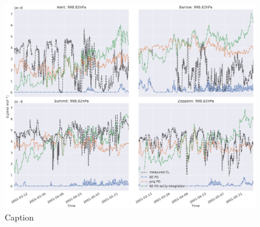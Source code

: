 \begin{figure}
    \centering
    \includegraphics[width = \linewidth]{Chapter6_Results/images/ozone_2001_newClyIntegration.png}
    \caption{Caption}
    \label{fig:test_ClyInt}
\end{figure}